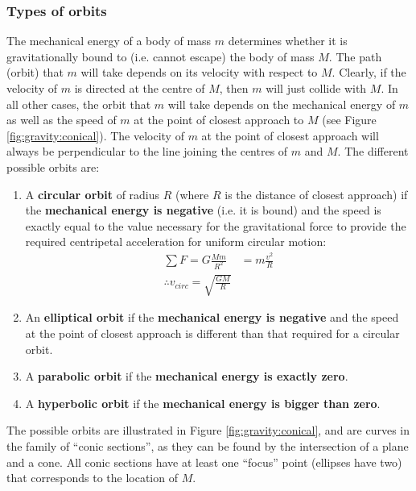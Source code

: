 \subsubsection{Types of orbits}
The mechanical energy of a body of mass $m$ determines whether it is gravitationally bound to (i.e. cannot escape) the body of mass $M$. The path (orbit) that $m$ will take depends on its velocity with respect to $M$. Clearly, if the velocity of $m$ is directed at the centre of $M$, then $m$ will just collide with $M$. In all other cases, the orbit that $m$ will take depends on the mechanical energy of $m$ as well as the speed of $m$ at the point of closest approach to $M$ (see Figure \ref{fig:gravity:conical}). The velocity of $m$ at the point of closest approach will always be perpendicular to the line joining the centres of $m$ and $M$. The different possible orbits are:
\begin{enumerate}
\item A \textbf{circular orbit} of radius $R$ (where $R$ is the distance of closest approach) if the \textbf{mechanical energy is negative} (i.e. it is bound) and the speed is exactly equal to the value necessary for the gravitational force to provide the required centripetal acceleration for uniform circular motion:
\begin{align*}
\sum F = G\frac{Mm}{R^2} &= m\frac{v^2}{R}\\
\therefore v_{circ}=\sqrt{\frac{GM}{R}}
\end{align*}
\item An \textbf{elliptical orbit} if the \textbf{mechanical energy is negative} and the speed at the point of closest approach is different than that required for a circular orbit.
\item A \textbf{parabolic orbit} if the \textbf{mechanical energy is exactly zero}.
\item A \textbf{hyperbolic orbit} if the \textbf{mechanical energy is bigger than zero}.
\end{enumerate}
The possible orbits are illustrated in Figure \ref{fig:gravity:conical}, and are curves in the family of ``conic sections'', as they can be found by the intersection of a plane and a cone. All conic sections have at least one ``focus'' point (ellipses have two) that corresponds to the location of $M$. 

